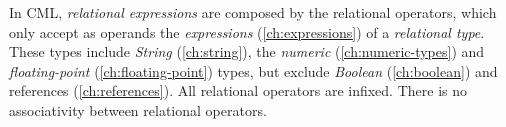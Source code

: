 In CML, \emph{relational expressions} are composed by the relational operators,
which only accept as operands the \emph{expressions} (\ref{ch:expressions})
of a \emph{relational type}.
These types include \emph{String} (\ref{ch:string}),
the \emph{numeric} (\ref{ch:numeric-types})
and \emph{floating-point} (\ref{ch:floating-point}) types,
but exclude \emph{Boolean} (\ref{ch:boolean})
and references (\ref{ch:references}).
All relational operators are infixed.
There is no associativity between relational operators.
